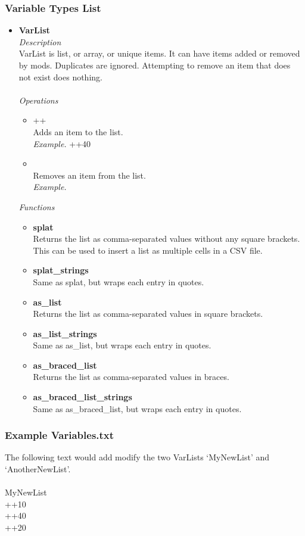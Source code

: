 \documentclass{article}
\begin{document}
\subsubsection{Variable Types List}\label{Section:VariableTypesList}
\begin{itemize}
\item \textbf{VarList}\\
\textit{Description}\\
VarList is list, or array, or unique items. It can have items added or removed by mods. Duplicates are ignored. Attempting to remove an item that does not exist does nothing.\\\\
\textit{Operations}
\begin{itemize}
	\item ++\\
	Adds an item to the list.\\
	\textit{Example.} ++40
	\item \textminus\textminus\\
	Removes an item from the list.\\
	\textit{Example.}  \textminus{}
\end{itemize}
\textit{Functions}
\begin{itemize}
\item \textbf{splat}\\
Returns the list as comma-separated values without any square brackets. This can be used to insert a list as multiple cells in a CSV file.
\item \textbf{splat\_strings}\\
Same as splat, but wraps each entry in quotes.
\item \textbf{as\_list}\\
Returns the list as comma-separated values in square brackets.
\item \textbf{as\_list\_strings}\\
Same as as\_list, but wraps each entry in quotes.
\item \textbf{as\_braced\_list}\\
Returns the list as comma-separated values in braces.
\item \textbf{as\_braced\_list\_strings}\\
Same as as\_braced\_list, but wraps each entry in quotes.
\end{itemize}
\end{itemize}

\subsubsection{Example Variables.txt}
The following text would add modify the two VarLists `MyNewList' and `AnotherNewList'.\\\\
MyNewList\\
++10\\
++40\\
++20\\
\textminus{}\\
\end{document}
